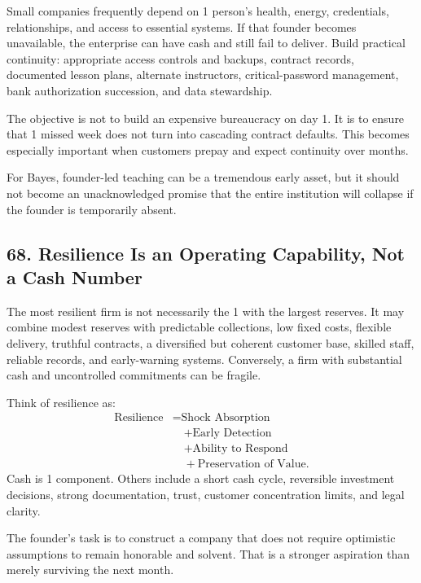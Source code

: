 Small companies frequently depend on 1 person's health, energy, credentials, relationships, and access to essential systems. If that founder becomes unavailable, the enterprise can have cash and still fail to deliver. Build practical continuity: appropriate access controls and backups, contract records, documented lesson plans, alternate instructors, critical-password management, bank authorization succession, and data stewardship.

The objective is not to build an expensive bureaucracy on day 1. It is to ensure that 1 missed week does not turn into cascading contract defaults. This becomes especially important when customers prepay and expect continuity over months.

For Bayes, founder-led teaching can be a tremendous early asset, but it should not become an unacknowledged promise that the entire institution will collapse if the founder is temporarily absent.

\subsection*{68. Resilience Is an Operating Capability, Not a Cash Number}

The most resilient firm is not necessarily the 1 with the largest reserves. It may combine modest reserves with predictable collections, low fixed costs, flexible delivery, truthful contracts, a diversified but coherent customer base, skilled staff, reliable records, and early-warning systems. Conversely, a firm with substantial cash and uncontrolled commitments can be fragile.

Think of resilience as:
\begin{equation}
\begin{aligned}
\text{Resilience} &= \text{Shock Absorption} \\
&\quad + \text{Early Detection} \\
&\quad + \text{Ability to Respond} \\
&\quad + \text{Preservation of Value}.
\end{aligned}
\end{equation}
Cash is 1 component. Others include a short cash cycle, reversible investment decisions, strong documentation, trust, customer concentration limits, and legal clarity.

The founder's task is to construct a company that does not require optimistic assumptions to remain honorable and solvent. That is a stronger aspiration than merely surviving the next month.
